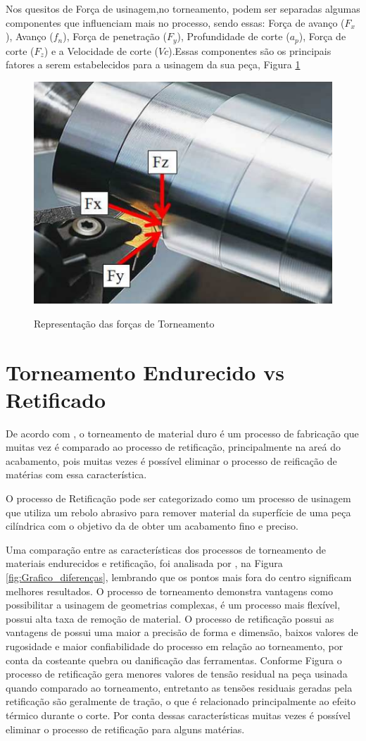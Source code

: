 \documentclass[deposito, acronym, symbols]{fei}
\begin{document}
Nos quesitos de Força de usinagem,no torneamento, podem ser separadas algumas componentes que influenciam mais no processo, sendo essas: Força de avanço ($F_x$), Avanço ($f_n$), Força de penetração ($F_y$), Profundidade de corte ($a_p$), Força de corte ($F_z$) e a Velocidade de corte ($Vc$).Essas componentes são os principais fatores a serem estabelecidos para a usinagem da sua peça, Figura \ref{fig:Forças_FxFyFz}

\begin{figure}[!htb]
 \centering
    \caption{Representação das forças de Torneamento}
    \includegraphics[width=0.5\linewidth]{Imagens/Exp02_forças_torneamento.png}
    \label{fig:Forças_FxFyFz}
 \end{figure}

\section{Torneamento Endurecido vs Retificado}

De acordo com \textcite{gomes2016estudo}, o torneamento de material duro é um processo de fabricação que muitas vez é comparado ao processo de retificação, principalmente na areá do acabamento, pois muitas vezes é possível eliminar o processo de reificação de matérias com essa característica.

O processo de Retificação pode ser categorizado como um processo de usinagem que utiliza um rebolo abrasivo para remover material da superfície de uma peça cilíndrica com o objetivo da de obter um acabamento fino e preciso.

Uma comparação entre as características dos processos de torneamento de materiais endurecidos e retificação, foi analisada por \textcite{gomes2016estudo}, na Figura \ref{fig:Grafico_diferenças}, lembrando que os pontos mais fora do centro significam melhores resultados. O processo de torneamento demonstra vantagens como possibilitar a usinagem de geometrias complexas, é um processo mais flexível, possui alta taxa de remoção de material. O processo de retificação possui as vantagens de possui uma maior a precisão de forma e dimensão, baixos valores de rugosidade e maior confiabilidade do processo em relação ao torneamento, por conta da costeante quebra ou danificação das ferramentas. Conforme Figura \textcite{gomes2016estudo} o processo de retificação gera menores valores de tensão residual na peça usinada quando comparado ao torneamento, entretanto as tensões residuais geradas pela retificação são geralmente de tração, o que é relacionado principalmente ao efeito térmico durante o corte. Por conta dessas características muitas vezes é possível eliminar o processo de retificação para alguns matérias.
\end{document}

